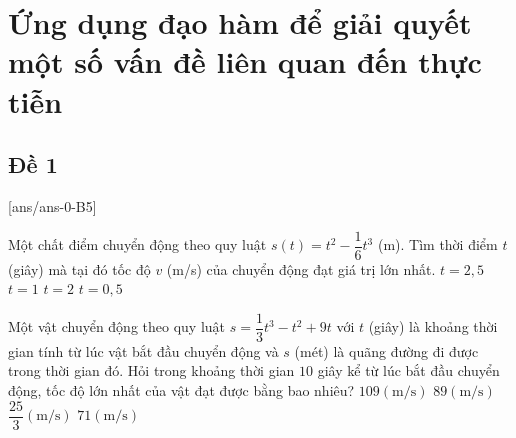 \section{Ứng dụng đạo hàm để giải quyết một số vấn đề liên quan đến thực tiễn}
\subsection{Đề 1}
[ans/ans-0-B5]
\caulc
\begin{ex}%
	Một chất điểm chuyển động theo quy luật $s(t) = t^2 - \dfrac{1}{6}t^3$ (m). Tìm thời điểm $t$ (giây) mà tại đó tốc độ $v$ (m/s) của chuyển động đạt giá trị lớn nhất.
	\choice
	{$t = 2{,}5$}
	{$t = 1$}
	{\True $t = 2$}
	{$t = 0{,}5$}
\end{ex}

\begin{ex}%
	Một vật chuyển động theo quy luật $s=\dfrac{1}{3}t^3-t^2+9t$ với $t$ (giây) là khoảng thời gian tính từ lúc vật bắt đầu chuyển động và $s$ (mét) là quãng đường đi được trong thời gian đó. Hỏi trong khoảng thời gian $10$ giây kể từ lúc bắt đầu chuyển động, tốc độ lớn nhất của vật đạt được bằng bao nhiêu?
	\choice
	{$109\left(\mathrm{m/s}\right)$}
	{\True $89\left(\mathrm{m/s}\right)$}
	{$\dfrac{25}{3}\left(\mathrm{m/s}\right)$}
	{$71\left(\mathrm{m/s}\right)$}
\end{ex}


